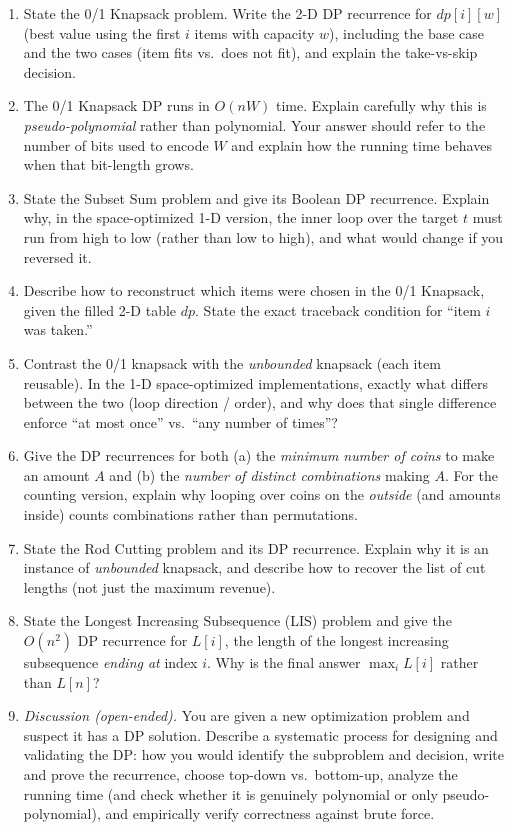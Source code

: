 \documentclass[11pt]{article}
\begin{document}
\begin{enumerate}[label=\textbf{A\arabic*.}, leftmargin=2.2em]
\item State the 0/1 Knapsack problem. Write the 2-D DP recurrence for
$\mathit{dp}[i][w]$ (best value using the first $i$ items with capacity $w$), including the
base case and the two cases (item fits vs.\ does not fit), and explain the take-vs-skip
decision.

\item The 0/1 Knapsack DP runs in $O(nW)$ time. Explain carefully why this is
\emph{pseudo-polynomial} rather than polynomial. Your answer should refer to the number of
bits used to encode $W$ and explain how the running time behaves when that bit-length
grows.

\item State the Subset Sum problem and give its Boolean DP recurrence. Explain why, in the
space-optimized 1-D version, the inner loop over the target $t$ must run from high to low
(rather than low to high), and what would change if you reversed it.

\item Describe how to reconstruct which items were chosen in the 0/1 Knapsack, given the
filled 2-D table $\mathit{dp}$. State the exact traceback condition for ``item $i$ was
taken.''

\item Contrast the 0/1 knapsack with the \emph{unbounded} knapsack (each item reusable). In
the 1-D space-optimized implementations, exactly what differs between the two (loop
direction / order), and why does that single difference enforce ``at most once'' vs.\
``any number of times''?

\item Give the DP recurrences for both (a) the \emph{minimum number of coins} to make an
amount $A$ and (b) the \emph{number of distinct combinations} making $A$. For the counting
version, explain why looping over coins on the \emph{outside} (and amounts inside) counts
combinations rather than permutations.

\item State the Rod Cutting problem and its DP recurrence. Explain why it is an instance of
\emph{unbounded} knapsack, and describe how to recover the list of cut lengths (not just
the maximum revenue).

\item State the Longest Increasing Subsequence (LIS) problem and give the $O(n^2)$ DP
recurrence for $L[i]$, the length of the longest increasing subsequence \emph{ending at}
index $i$. Why is the final answer $\max_i L[i]$ rather than $L[n]$?

\item \emph{Discussion (open-ended).} You are given a new optimization problem and suspect
it has a DP solution. Describe a systematic process for designing and validating the DP:
how you would identify the subproblem and decision, write and prove the recurrence, choose
top-down vs.\ bottom-up, analyze the running time (and check whether it is genuinely
polynomial or only pseudo-polynomial), and empirically verify correctness against brute
force.

\end{enumerate}
\end{document}
